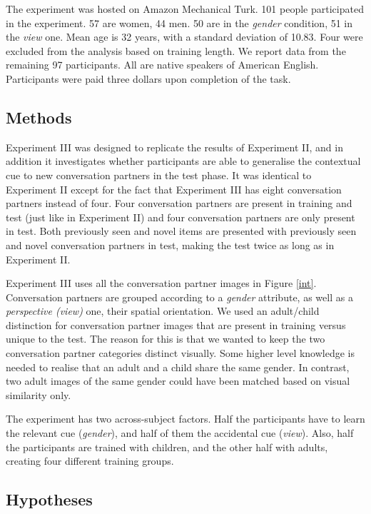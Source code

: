 \documentclass{frontiersSCNS} %
\begin{document}
The experiment was hosted on Amazon Mechanical Turk. 101 people participated in the experiment. 57 are women, 44 men. 50 are in the \emph{gender} condition, 51 in the \emph{view} one. Mean age is 32 years, with a standard deviation of 10.83. Four were excluded from the analysis based on training length. We report data from the remaining 97 participants. All are native speakers of American English. Participants were paid three dollars upon completion of the task.

\subsection{Methods}

Experiment III was designed to replicate the results of Experiment II, and in addition it  investigates whether participants are able to generalise the contextual cue to new conversation partners in the test phase. It was identical to Experiment II except for the fact that Experiment III has eight conversation partners instead of four. Four conversation partners are present in training and test (just like in Experiment II) and four conversation partners are only present in test. 
Both previously seen and novel items are presented with previously seen and novel conversation partners in test, making the test twice as long as in Experiment II. 

Experiment III uses all the conversation partner images in Figure \ref{int}. Conversation partners are grouped according to a \emph{gender} attribute, as well as a \emph{perspective (view)} one, their spatial orientation. We used an adult/child distinction for conversation partner images that are present in training versus unique to the test. The reason for this is that we wanted to keep the two conversation partner categories distinct visually. Some higher level knowledge is needed to realise that an adult and a child share the same gender. In contrast, two adult images of the same gender could have been matched based on visual similarity only.  

The experiment has two across-subject factors. Half the participants have to learn the relevant cue (\emph{gender}), and half of them the accidental cue (\emph{view}). Also, half the participants are trained with children, and the other half with adults, creating four different training groups.

\subsection{Hypotheses}
\end{document}
